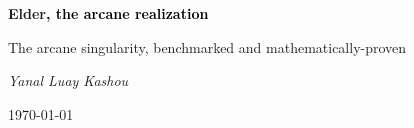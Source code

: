 \documentclass[11pt,twoside,openright]{book}
\begin{document}
\frontmatter

\begin{titlepage}
    \centering
    \vspace*{2cm}
    {\Huge\bfseries \textcolor{DarkSkyBlue}{Elder}\textrm{\textcolor{black}{, the arcane realization}}\par}
    \vspace{2cm}
    {\Large The arcane singularity, benchmarked and mathematically-proven\par}
    \vspace{4cm}
    {\Large\itshape Yanal Luay Kashou\par}
    \vfill
    {\large \today\par}
\end{titlepage}

\tableofcontents
\listoffigures
\listoftables
\listofalgorithms
\listoftheorems

\mainmatter



\backmatter

\printbibliography[title=References]

\printindex
\end{document}
